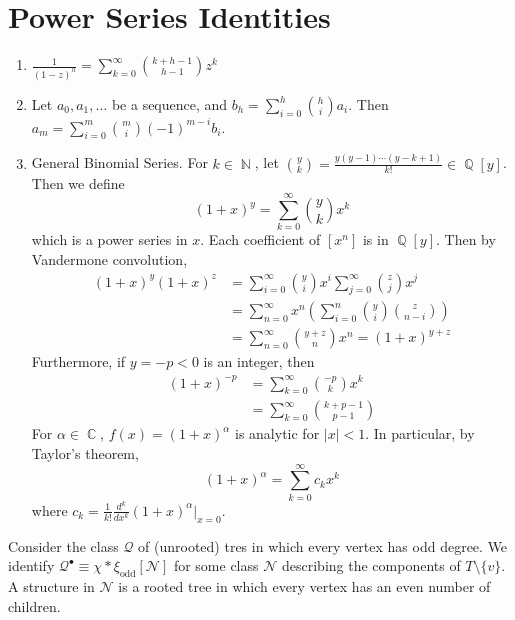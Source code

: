 \documentclass[11pt, a4paper]{memoir}
\DeclareMathOperator{\N}{{\mathbb{N}}}
\DeclareMathOperator{\Q}{{\mathbb{Q}}}
\DeclareMathOperator{\C}{{\mathbb{C}}}
\theoremstyle{change}
\theoremstyle{plain}
\theoremstyle{nonumberplain}
\numberwithin{equation}{section}
\begin{document}
\chapter{Power Series Identities}
\begin{enumerate}[nl,r]
    \item $\displaystyle\frac{1}{(1-z)^h}=\sum_{k=0}^\infty\binom{k+h-1}{h-1}z^k$
    \item Let $a_0,a_1,\ldots$ be a sequence, and $b_h=\sum_{i=0}^h\binom{h}{i}a_i$.
        Then $a_m=\sum_{i=0}^m\binom{m}{i}(-1)^{m-i}b_i$.
    \item General Binomial Series.
        For $k\in\N$, let $\binom{y}{k}=\frac{y(y-1)\cdots(y-k+1)}{k!}\in\Q[y]$.
        Then we define
        \begin{equation*}
            (1+x)^y=\sum_{k=0}^\infty\binom{y}{k}x^k
        \end{equation*}
        which is a power series in $x$.
        Each coefficient of $[x^n]$ is in $\Q[y]$.
        Then by Vandermone convolution,
        \begin{align*}
            (1+x)^y(1+x)^z&=\sum_{i=0}^\infty\binom{y}{i}x^i\sum_{j=0}^\infty\binom{z}{j}x^j\\
                          &=\sum_{n=0}^\infty x^n\left(\sum_{i=0}^n\binom{y}{i}\binom{z}{n-i}\right)\\
                          &= \sum_{n=0}^\infty\binom{y+z}{n}x^n=(1+x)^{y+z}
        \end{align*}
        Furthermore, if $y=-p<0$ is an integer, then
        \begin{align*}
            (1+x)^{-p}&=\sum_{k=0}^\infty\binom{-p}{k}x^k\\
                      &=\sum_{k=0}^\infty\binom{k+p-1}{p-1}
        \end{align*}
        For $\alpha\in\C$, $f(x)=(1+x)^\alpha$ is analytic for $|x|<1$.
        In particular, by Taylor's theorem,
        \begin{equation*}
            (1+x)^\alpha=\sum_{k=0}^\infty c_kx^k
        \end{equation*}
        where $c_k=\frac{1}{k!}\frac{d^k}{dx^k}(1+x)^\alpha|_{x=0}$.
\end{enumerate}
Consider the class $\mathcal{Q}$ of (unrooted) tres in which every vertex has odd degree.
We identify $\mathcal{Q}^\bullet\equiv\chi *\xi_{\text{odd}}[\mathcal{N}]$ for some class $\mathcal{N}$ describing the components of $T\setminus \{v\}$.
A structure in $\mathcal{N}$ is a rooted tree in which every vertex has an even number of children.
\end{document}
